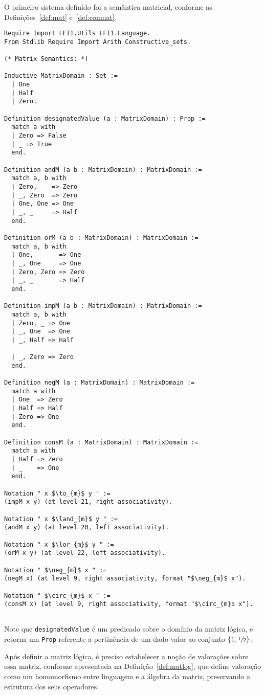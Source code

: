       O primeiro sistema definido foi a semântica matricial, conforme as Definições~\ref{def:mat} e~\ref{def:conmat}.
      \begin{lstlisting}[name=Semantics, frame=single, language=coq]
Require Import LFI1.Utils LFI1.Language.
From Stdlib Require Import Arith Constructive_sets.

(* Matrix Semantics: *)

Inductive MatrixDomain : Set :=
  | One
  | Half
  | Zero.

Definition designatedValue (a : MatrixDomain) : Prop :=
  match a with
  | Zero => False
  | _ => True
  end.

Definition andM (a b : MatrixDomain) : MatrixDomain :=
  match a, b with
  | Zero, _  => Zero
  | _, Zero  => Zero
  | One, One => One
  | _, _     => Half
  end.

Definition orM (a b : MatrixDomain) : MatrixDomain :=
  match a, b with
  | One, _     => One
  | _, One     => One
  | Zero, Zero => Zero
  | _, _       => Half
  end.

Definition impM (a b : MatrixDomain) : MatrixDomain :=
  match a, b with
  | Zero, _ => One
  | _, One  => One
  | _, Half => Half

  | _, Zero => Zero
  end.

Definition negM (a : MatrixDomain) : MatrixDomain :=
  match a with
  | One  => Zero
  | Half => Half
  | Zero => One
  end.

Definition consM (a : MatrixDomain) : MatrixDomain :=
  match a with
  | Half => Zero
  | _    => One
  end.

Notation " x $\to_{m}$ y " := 
(impM x y) (at level 21, right associativity).

Notation " x $\land_{m}$ y " := 
(andM x y) (at level 20, left associativity).

Notation " x $\lor_{m}$ y " := 
(orM x y) (at level 22, left associativity).

Notation " $\neg_{m}$ x " := 
(negM x) (at level 9, right associativity, format "$\neg_{m}$ x").

Notation " $\circ_{m}$ x " := 
(consM x) (at level 9, right associativity, format "$\circ_{m}$ x").
        
      \end{lstlisting}
      Note que \texttt{designatedValue} é um predicado sobre o domínio da matriz lógica, e retorna um \texttt{Prop} referente a pertinência de um dado valor ao conjunto $\{1,\sfrac{1}{2}{}\}$.

      Após definir a matriz lógica, é preciso estabelecer a noção de valorações sobre essa matriz, conforme apresentada na Definição~\ref{def:matlog}, que define valoração como um homomorfismo entre linguagem e a álgebra da matriz, preservando a estrutura dos seus operadores.
    

